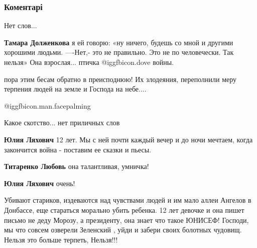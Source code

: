  
 
 
 
 
\subsubsection{Коментарі}
\label{sec:12_10_2021.fb.titarenko_lubov.1.pozor_savenkova_faina.cmt}

\begin{itemize} %
Нет слов...

\begin{itemize} %
\textbf{Тамара Долженкова}
я ей говорю: «ну ничего, будешь со мной и другими хорошими людьми.
—-Нет,- это не правильно. Это не по человечески.
Так нельзя»
Она взрослая... птичка @igg{fbicon.dove} войны.
\end{itemize} %


пора этим бесам обратно в преисподнюю! Их злодеяния, переполнили меру терпения
людей на земле и Господа на небе....

 @igg{fbicon.man.facepalming} 


Какое скотство... нет приличных слов

\begin{itemize} %
\textbf{Юлия Ляхович} 12 лет. Мы с ней почти каждый вечер и до ночи мечтаем, когда закончится война - поставим ее сказки и пьесы.

\textbf{Титаренко Любовь} она талантливая, умничка!

\textbf{Юлия Ляхович} очень!


Убивают стариков, издеваются над чувствами людей и им мало аллеи Ангелов в
Донбассе, еще стараться морально убить ребенка. 12 лет девочке и она пишет
письмо не деду Морозу, а президенту, она знает что такое ЮНИСЕФ! Господи, мы
что совсем озверели Зеленский , уйди и забери своих болотных чудовищ. Нельзя
это больше терпеть, Нельзя!!!


\end{itemize}
\end{itemize}
